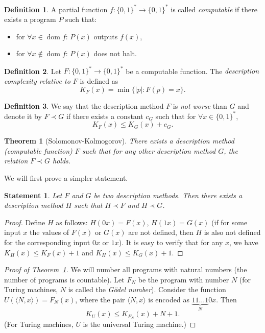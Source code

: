 \documentclass[12pt,sans]{article}
\newcommand{\bits}{\{0,1\}}
\newcommand{\bitstr}{\bits^*}
\DeclareMathOperator{\dom}{dom}
\theoremstyle{definition}
\newtheorem{definition}{Definition}[section]
\theoremstyle{plain}
\newtheorem{theorem}{Theorem}[section]
\newtheorem{statement}{Statement}[section]
\theoremstyle{remark}
\begin{document}
\begin{definition}
    A partial function $f:\bitstr\to\bitstr$ is called \emph{computable} if there exists a program $P$ such that:
    \begin{itemize}
        \item for $\forall x \in \dom f$: $P(x)$ outputs $f(x)$,
        \item for $\forall x \not\in \dom f$: $P(x)$ does not halt.
    \end{itemize}
\end{definition}

\begin{definition}
    Let $F:\bitstr\to\bitstr$ be a computable function. The \emph{description complexity relative to $F$} is defined as
    \[K_F(x) = \min\{|p| : F(p) = x\}.\]
\end{definition}

\begin{definition}
    We say that the description method $F$ is \emph{not worse} than $G$ and denote it by $F \prec G$ if there exists a constant $c_G$ such that for $\forall x \in \bitstr$,
    \[K_F(x) \le K_G(x) + c_G.\]
\end{definition}

\begin{theorem}[Solomonov-Kolmogorov]\label{thm:solomonov-kolmogorov}
    There exists a description method (computable function) $F$ such that for any other description method $G$, the relation $F \prec G$ holds.
\end{theorem}

We will first prove a simpler statement.
\begin{statement}
    Let $F$ and $G$ be two description methods. Then there exists a description method $H$ such that $H \prec F$ and $H \prec G$.
\end{statement}

\begin{proof}
    Define $H$ as follows: $H(0x) = F(x)$, $H(1x) = G(x)$ (if for some input $x$ the values of $F(x)$ or $G(x)$ are not defined, then $H$ is also not defined for the corresponding input $0x$ or $1x$). It is easy to verify that for any $x$, we have $K_H(x) \le K_F(x) + 1$ and $K_H(x) \le K_G(x) + 1$.
\end{proof}

\begin{proof}[Proof of Theorem~\ref{thm:solomonov-kolmogorov}]
    We will number all programs with natural numbers (the number of programs is countable). Let $F_N$ be the program with number $N$ (for Turing machines, $N$ is called the \emph{Gödel number}). Consider the function $U(\langle N, x\rangle) = F_N(x)$, where the pair $\langle N, x\rangle$ is encoded as $\underbrace{11\dots1}_{N}0x$. Then
    \[
    K_U(x) \le K_{F_N}(x) + N + 1.
    \]
    (For Turing machines, $U$ is the universal Turing machine.)
\end{proof}
\end{document}
